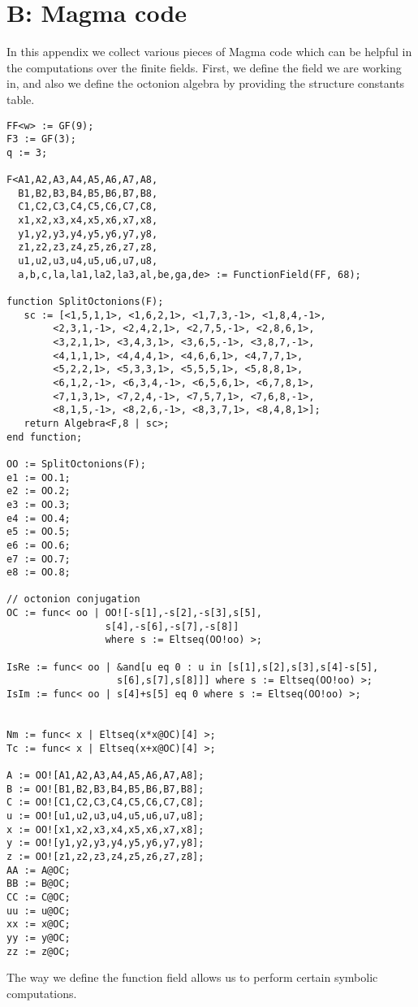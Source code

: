 

\chapter{B: Magma code}
\label{AppD}

In this appendix we collect various pieces
of Magma code which can be helpful in the
computations over the finite fields. First, we define the field we are working 
in, and also we define the octonion algebra
by providing the structure constants table.
\begin{verbatim}
FF<w> := GF(9); 
F3 := GF(3); 
q := 3;

F<A1,A2,A3,A4,A5,A6,A7,A8,
  B1,B2,B3,B4,B5,B6,B7,B8,
  C1,C2,C3,C4,C5,C6,C7,C8,
  x1,x2,x3,x4,x5,x6,x7,x8,
  y1,y2,y3,y4,y5,y6,y7,y8,
  z1,z2,z3,z4,z5,z6,z7,z8,
  u1,u2,u3,u4,u5,u6,u7,u8,
  a,b,c,la,la1,la2,la3,al,be,ga,de> := FunctionField(FF, 68);

function SplitOctonions(F);
   sc := [<1,5,1,1>, <1,6,2,1>, <1,7,3,-1>, <1,8,4,-1>, 
   		<2,3,1,-1>, <2,4,2,1>, <2,7,5,-1>, <2,8,6,1>,
   		<3,2,1,1>, <3,4,3,1>, <3,6,5,-1>, <3,8,7,-1>, 
   		<4,1,1,1>, <4,4,4,1>, <4,6,6,1>, <4,7,7,1>,
   		<5,2,2,1>, <5,3,3,1>, <5,5,5,1>, <5,8,8,1>,
   		<6,1,2,-1>, <6,3,4,-1>, <6,5,6,1>, <6,7,8,1>,
   		<7,1,3,1>, <7,2,4,-1>, <7,5,7,1>, <7,6,8,-1>,
   		<8,1,5,-1>, <8,2,6,-1>, <8,3,7,1>, <8,4,8,1>];
   return Algebra<F,8 | sc>;
end function;

OO := SplitOctonions(F);
e1 := OO.1;
e2 := OO.2;
e3 := OO.3;
e4 := OO.4;
e5 := OO.5;
e6 := OO.6;
e7 := OO.7;
e8 := OO.8;

// octonion conjugation
OC := func< oo | OO![-s[1],-s[2],-s[3],s[5],
                 s[4],-s[6],-s[7],-s[8]] 
                 where s := Eltseq(OO!oo) >; 
                 
IsRe := func< oo | &and[u eq 0 : u in [s[1],s[2],s[3],s[4]-s[5],
                   s[6],s[7],s[8]]] where s := Eltseq(OO!oo) >;
IsIm := func< oo | s[4]+s[5] eq 0 where s := Eltseq(OO!oo) >;


Nm := func< x | Eltseq(x*x@OC)[4] >;
Tc := func< x | Eltseq(x+x@OC)[4] >;

A := OO![A1,A2,A3,A4,A5,A6,A7,A8];
B := OO![B1,B2,B3,B4,B5,B6,B7,B8];
C := OO![C1,C2,C3,C4,C5,C6,C7,C8];
u := OO![u1,u2,u3,u4,u5,u6,u7,u8];
x := OO![x1,x2,x3,x4,x5,x6,x7,x8];
y := OO![y1,y2,y3,y4,y5,y6,y7,y8];
z := OO![z1,z2,z3,z4,z5,z6,z7,z8];
AA := A@OC;
BB := B@OC;
CC := C@OC;
uu := u@OC;
xx := x@OC;
yy := y@OC;
zz := z@OC;
\end{verbatim}
The way we define the function field allows
us to perform certain symbolic computations.

